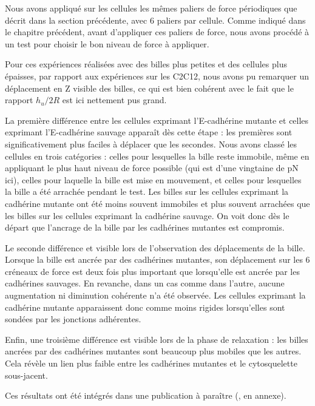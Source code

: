 \documentclass{report}
\begin{document}
 Nous avons appliqué sur les cellules les mêmes paliers de force périodiques que décrit dans la section précédente, avec 6 paliers par cellule. Comme indiqué dans le chapitre précédent, avant d'appliquer ces paliers de force, nous avons procédé à un test pour choisir le bon niveau de force à appliquer. 

 Pour ces expériences réalisées avec des billes plus petites et des cellules plus épaisses, par rapport aux expériences sur les C2C12, nous avons pu remarquer un déplacement en Z visible des billes, ce qui est bien cohérent avec le fait que le rapport $h_u/2R$ est ici nettement pus grand.
 
 La première différence entre les cellules exprimant l'E-cadhérine mutante et celles exprimant l'E-cadhérine sauvage apparaît dès cette étape : les premières  sont significativement plus faciles à déplacer que les secondes. Nous avons classé les cellules en trois catégories : celles pour lesquelles la bille reste immobile, même en appliquant le plus haut niveau de force possible (qui est d'une vingtaine de pN ici), celles pour laquelle la bille est mise en mouvement, et celles pour lesquelles la bille a été arrachée pendant le test. Les billes sur les cellules exprimant la cadhérine mutante ont été moins souvent immobiles et plus souvent arrachées que les billes sur les cellules exprimant la cadhérine sauvage. On voit donc dès le départ que l'ancrage de la bille par les cadhérines mutantes est compromis. 
 
 Le seconde différence et visible lors de l'observation des déplacements de la bille. Lorsque la bille est ancrée par des cadhérines mutantes, son déplacement sur les 6 créneaux de force est deux fois plus important que lorsqu'elle est ancrée par les cadhérines sauvages. En revanche, dans un cas comme dans l'autre, aucune augmentation ni diminution cohérente n'a été observée. Les cellules exprimant la cadhérine mutante apparaissent donc comme moins rigides lorsqu'elles sont sondées par les jonctions adhérentes. 
 
 Enfin, une troisième différence est visible lors de la phase de relaxation : les billes ancrées par des cadhérines mutantes sont beaucoup plus mobiles que les autres. Cela révèle un lien plus faible entre les cadhérines mutantes et le cytosquelette sous-jacent. 

 Ces résultats ont été intégrés dans une publication à paraître (\cite{strale_formation_2012}, en annexe).
\end{document}
